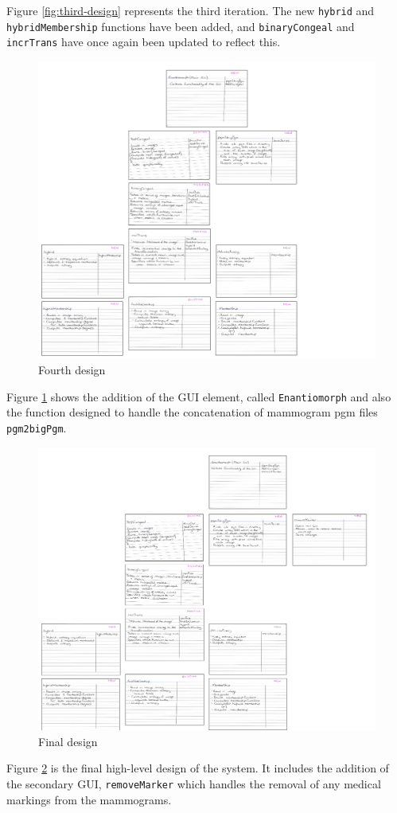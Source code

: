 Figure \ref{fig:third-design} represents the third iteration. The new \texttt{hybrid} and \texttt{hybridMembership} functions have been added, and \texttt{binaryCongeal} and \texttt{incrTrans} have once again been updated to reflect this.

\begin{figure}[H]
  \center
  \includegraphics[scale=0.5]{Appendix4/imgs/fourth.png}
  \caption{Fourth design}
  \label{fig:fourth-design}
\end{figure}

Figure \ref{fig:fourth-design} shows the addition of the \acrshort{GUI} element, called \texttt{Enantiomorph} and also the function designed to handle the concatenation of mammogram pgm files \texttt{pgm2bigPgm}.

\begin{figure}[H]
  \center
  \includegraphics[width = \textwidth]{Appendix4/imgs/final.png}
  \caption{Final design}
  \label{fig:final-design}
\end{figure}

Figure \ref{fig:final-design} is the final high-level design of the system. It includes the addition of the secondary \acrshort{GUI}, \texttt{removeMarker} which handles the removal of any medical markings from the mammograms.

